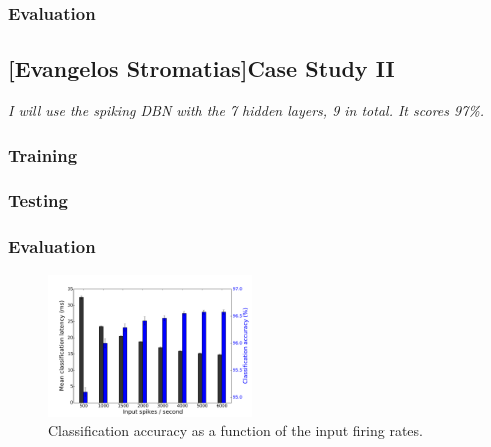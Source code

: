 \subsubsection{Evaluation}

\subsection{[Evangelos Stromatias]Case Study II}
\textit{I will use the spiking DBN with the 7 hidden layers, 9 in total. It scores 97\%.}
\subsubsection{Training}
\subsubsection{Testing}
\subsubsection{Evaluation}

\begin{figure}[hbt!]
	\centering
	\includegraphics[width=0.48\textwidth]{images/evan/meanCAvsLatencyvsFiringrate_7hlayer.pdf}
	\caption{Classification accuracy as a function of the input firing rates.}
	\label{Fig:rateVSca}
\end{figure} 
